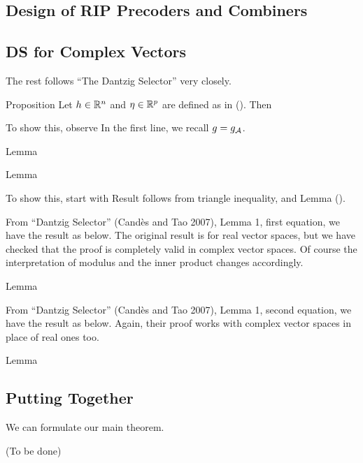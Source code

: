 \subsection{Design of RIP Precoders and Combiners}

\subsection{DS for Complex Vectors}

The rest follows ``The Dantzig Selector'' very closely.


\Result
{Proposition}
{
Let \(h \in \mathbb{R}^n\) and \(\eta \in \mathbb{R}^p\) are defined as in ().
Then
%
%
}

To show this, observe
%
%
In the first line, we recall \(g =g_{\mathcal{A}}\).

\Result
{Lemma}
{
%
%
}

\Result
{Lemma}
{
%
%
}

To show this, start with
%
%
Result follows from triangle inequality, and Lemma ().

From ``Dantzig Selector'' (Cand\`es and Tao 2007), Lemma 1, first equation, we have the result as below.
The original result is for real vector spaces, but we have checked that the proof is completely valid in complex vector spaces.
Of course the interpretation of modulus and the inner product changes accordingly.

\Result
{Lemma}
{
%
%
}

From ``Dantzig Selector'' (Cand\`es and Tao 2007), Lemma 1, second equation, we have the result as below.
Again, their proof works with complex vector spaces in place of real ones too.

\Result
{Lemma}
{
%
%
}

\subsection{Putting Together}

We can formulate our main theorem.

{ \color{red} (To be done) }
